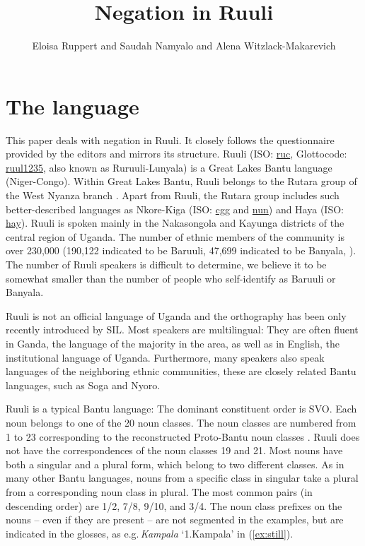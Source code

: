 \documentclass[output=paper,colorlinks,citecolor=brown,draftmode]{langscibook}
\author{Eloisa Ruppert\affiliation{Catholic University of Leuven} %
and Saudah Namyalo\affiliation{Makerere University} and Alena Witzlack-Makarevich\affiliation{Hebrew University of Jerusalem}%
}
\title{Negation in Ruuli}
\begin{document}
\maketitle

\section{The language}\label{sec-intro}

This paper deals with negation in Ruuli. 
It closely follows the questionnaire provided by the editors  and mirrors its structure.
Ruuli (ISO: \href{https://iso639-3.sil.org/code/ruc}{ruc}, Glottocode: \href{https://glottolog.org/resource/languoid/id/ruul1235}{ruul1235}, also known as Ruruuli-Lunyala) is a Great Lakes Bantu language (Niger-Congo). 
Within Great Lakes Bantu, Ruuli belongs to the Rutara group of the West Nyanza branch \citep{Schoenbrun1997}.
Apart from Ruuli, the Rutara group includes such better-described languages as Nkore-Kiga (ISO: \href{https://iso639-3.sil.org/code/cgg}{cgg} and \href{https://iso639-3.sil.org/code/nun}{nun}) and Haya (ISO: \href{https://iso639-3.sil.org/code/hay}{hay}). 
Ruuli is spoken mainly in the Nakasongola and Kayunga districts of the central region of Uganda. 
The number of ethnic members of the community is over 230,000 (190,122 indicated to be Baruuli, 47,699 indicated to be Banyala, \citealt{Uganda2016}). 
The number of Ruuli speakers is difficult to determine, we believe it to be somewhat smaller than the number of people who self-identify as Baruuli or Banyala.

Ruuli is not an official language of Uganda and the orthography has been only recently introduced by SIL. 
Most speakers are multilingual: 
They are often fluent in Ganda, the language of the majority in the area, as well as in English, the institutional language of Uganda. 
Furthermore, many speakers also speak languages of the neighboring ethnic communities, these are closely related Bantu languages, such as Soga and Nyoro.

Ruuli is a typical Bantu language: 
The dominant constituent order is SVO. 
Each noun belongs to one of the 20 noun classes. 
The noun classes are numbered from 1 to 23 corresponding to the reconstructed Proto-Bantu noun classes \citep[237–239]{VandeVelde2019}. 
Ruuli does not have the correspondences of the noun classes 19 and 21. 
Most nouns have both a singular and a plural form, which belong to two different classes. 
As in many other Bantu languages, nouns from a specific class in singular take a plural from a corresponding noun class in plural. 
The most common pairs (in descending order) are 1/2, 7/8, 9/10, and 3/4. 
The noun class prefixes on the nouns – even if they are present – are not segmented in the examples, but are indicated in the glosses, as e.g.\,\textit{Kampala} `1.Kampala’ in (\ref{ex:still}).
\end{document}
